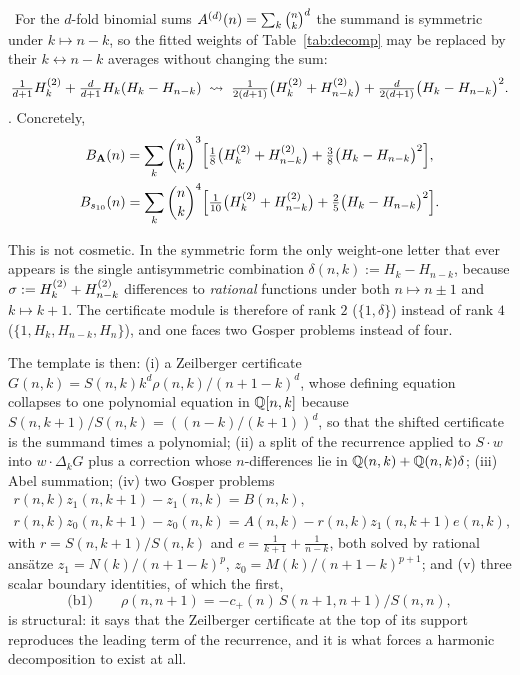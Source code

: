 \begin{observation}[symmetrisation]\label{obs:symm}
\Proved\ For the $d$-fold binomial sums $A^{(d)}(n)=\sum_k\binom{n}{k}^d$ the summand is
symmetric under $k\mapsto n-k$, so the fitted weights of Table~\ref{tab:decomp} may be
replaced by their $k\leftrightarrow n-k$ averages without changing the sum:
\[
   \tfrac1{d+1}H^{(2)}_{k}+\tfrac d{d+1}H_k(H_k-H_{n-k})
   \;\rightsquigarrow\;
   \tfrac1{2(d+1)}\bigl(H^{(2)}_{k}+H^{(2)}_{n-k}\bigr)+\tfrac d{2(d+1)}\bigl(H_k-H_{n-k}\bigr)^2 .
\]
. Concretely,
\[
 \begin{gathered}
   B_{\mathbf A}(n)=\sum_k\binom{n}{k}^3\Bigl[\tfrac18\bigl(H^{(2)}_{k}+H^{(2)}_{n-k}\bigr)+\tfrac38\bigl(H_k-H_{n-k}\bigr)^2\Bigr],\\
   B_{s_{10}}(n)=\sum_k\binom{n}{k}^4\Bigl[\tfrac1{10}\bigl(H^{(2)}_{k}+H^{(2)}_{n-k}\bigr)+\tfrac25\bigl(H_k-H_{n-k}\bigr)^2\Bigr].
 \end{gathered}
\]
\end{observation}

This is not cosmetic. In the symmetric form the only weight-one letter that ever appears
is the single antisymmetric combination $\delta(n,k):=H_k-H_{n-k}$, because
$\sigma:=H^{(2)}_{k}+H^{(2)}_{n-k}$ differences to \emph{rational} functions under both $n\mapsto
n\pm1$ and $k\mapsto k+1$. The certificate module is therefore of rank $2$
($\{1,\delta\}$) instead of rank $4$ ($\{1,H_k,H_{n-k},H_n\}$), and one faces two Gosper
problems instead of four.

The template is then: (i) a Zeilberger certificate
$G(n,k)=S(n,k)k^d\rho(n,k)/(n+1-k)^d$, whose defining equation collapses to one polynomial
equation in $\mathbb{Q}[n,k]$ because $S(n,k+1)/S(n,k)=((n-k)/(k+1))^d$, so that the shifted
certificate is the summand times a polynomial; (ii) a split of the recurrence applied to
$S\cdot w$ into $w\cdot\Delta_kG$ plus a correction whose $n$-differences lie in
$\mathbb{Q}(n,k)+\mathbb{Q}(n,k)\delta$; (iii) Abel summation; (iv) two Gosper problems
\[
 \begin{gathered}
   r(n,k)z_1(n,k+1)-z_1(n,k)=B(n,k),\\
   r(n,k)z_0(n,k+1)-z_0(n,k)=A(n,k)-r(n,k)z_1(n,k+1)e(n,k),
 \end{gathered}
\]
with $r=S(n,k+1)/S(n,k)$ and $e=\frac1{k+1}+\frac1{n-k}$, both solved by rational ans\"atze
$z_1=N(k)/(n+1-k)^{p}$, $z_0=M(k)/(n+1-k)^{p+1}$; and (v) three scalar boundary
identities, of which the first,
\[
   \text{(b1)}\qquad \rho(n,n+1)=-c_+(n)\,S(n+1,n+1)/S(n,n),
\]
is structural: it says that the Zeilberger certificate at the top of its support
reproduces the leading term of the recurrence, and it is what forces a harmonic
decomposition to exist at all.


